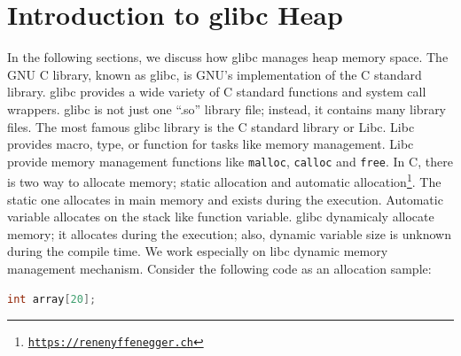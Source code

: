 \documentclass{masterthesis}
\newcommand*\libc{glibc}
\newcommand*\mallocc{\lstinline{malloc}\xspace}
\newcommand*\callocc{\lstinline{calloc}\xspace}
\begin{document}
\chapter{Introduction to \libc{} Heap}
\label{ch:introheap}
In the following sections, we discuss how \libc{} manages heap memory space.
The GNU C library, known as \libc{}, is GNU's implementation of the C standard library. \libc{} provides a wide variety of C standard functions and system call wrappers. \libc{} is not just one ``.so'' library file; instead, it contains many library files. The most famous \libc{} library is the C standard library or Libc. Libc provides macro, type, or function for tasks like memory management.
Libc provide memory management functions like \mallocc, \callocc{} and \lstinline{free}. In C, there is two way to allocate memory; static allocation and automatic allocation\footnote{\href{https://renenyffenegger.ch/notes/development/languages/C-C-plus-plus/C/libc/alloc/index}{\texttt{https://renenyffenegger.ch}}}. The static one allocates in main memory and exists during the execution. Automatic variable allocates on the stack like function variable. \libc{} dynamicaly allocate memory; it allocates during the execution; also, dynamic variable size is unknown during the compile time. We work especially on libc dynamic memory management mechanism. Consider the following code as an allocation sample:
\begin{lstlisting}[language=c,frame=tlrb]
int array[20];
\end{lstlisting}
\end{document}
